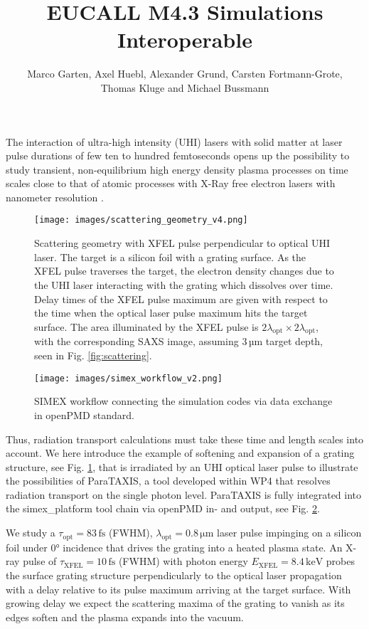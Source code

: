 \documentclass[a4paper]{article}
\title{EUCALL M4.3 Simulations Interoperable}
\author {Marco Garten, Axel Huebl, Alexander Grund, Carsten Fortmann-Grote, \\Thomas Kluge and Michael Bussmann}
\begin{document}
\maketitle

The interaction of ultra-high intensity (UHI) lasers with solid matter at laser pulse durations of few ten to hundred femtoseconds opens up the possibility to study transient, non-equilibrium high energy density plasma processes on time scales close to that of atomic processes with X-Ray free electron lasers with nanometer resolution \cite{Kluge2016}.

\begin{figure}
\centering
  \texttt{[image: images/scattering\_geometry\_v4.png]}
\caption{
Scattering geometry with XFEL pulse perpendicular to optical UHI laser. The target is a silicon foil with a grating surface. As the XFEL pulse traverses the target, the electron density changes due to the UHI laser interacting with the grating which dissolves over time. Delay times of the XFEL pulse maximum are given with respect to the time when the optical laser pulse maximum hits the target surface.
The area illuminated by the XFEL pulse is $2\lambda_\mathrm{opt} \times 2\lambda_\mathrm{opt}$, with the corresponding SAXS image, assuming $3\,\mathrm{µm}$ target depth, seen in Fig. \ref{fig:scattering}.
}
  \label{fig:density}
\end{figure}

\begin{figure}
\centering
  \texttt{[image: images/simex\_workflow\_v2.png]}
\caption{
SIMEX workflow connecting the simulation codes via data exchange in openPMD standard.
}
  \label{fig:workflows}
\end{figure}

Thus, radiation transport calculations must take these time and length scales into account. We here introduce the example of softening and expansion of a grating structure, see Fig. \ref{fig:density},  that is irradiated by an UHI optical laser pulse to illustrate the possibilities of ParaTAXIS, a tool developed within WP4 that resolves radiation transport on the single photon level. ParaTAXIS is fully integrated into the simex\_platform tool chain via openPMD \cite{Huebl2017} in- and output, see Fig. \ref{fig:workflows}.

We study a $\tau_\mathrm{opt} = 83\,\mathrm{fs}$ (FWHM), $\lambda_\mathrm{opt} = 0.8\,\mathrm{\mu m}$ laser pulse impinging on a silicon foil under 0° incidence that drives the grating into a heated plasma state. An X-ray pulse of $\tau_\mathrm{XFEL} = 10\,\mathrm{fs}$ (FWHM) with photon energy $E_\mathrm{XFEL} =8.4\,\mathrm{keV}$ probes the surface grating structure perpendicularly to the optical laser propagation with a delay relative to its pulse maximum arriving at the target surface. With growing delay we expect the scattering maxima of the grating to vanish as its edges soften and the plasma expands into the vacuum.
\end{document}
